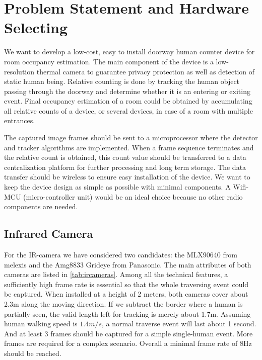\chapter{Problem Statement and Hardware Selecting} \label{ch:hardware}
We want to develop a low-cost, easy to install doorway human counter device for room occupancy estimation. The main component of the device is a low-resolution thermal camera to guarantee privacy protection as well as detection of static human being. Relative counting is done by tracking the human object passing through the doorway and determine whether it is an entering or exiting event. Final occupancy estimation of a room could be obtained by accumulating all relative counts of a device, or several devices, in case of a room with multiple entrances.

The captured image frames should be sent to a microprocessor where the detector and tracker algorithms are implemented. When a frame sequence terminates and the relative count is obtained, this count value should be transferred to a data centralization platform for further processing and long term storage. The data transfer should be wireless to ensure easy installation of the device. We want to keep the device design as simple as possible with minimal components. A Wifi-MCU (micro-controller unit) would be an ideal choice because no other radio components are needed.
\section{Infrared Camera}
For the IR-camera we have considered two candidates: the MLX90640 from melexis and the Amg8833 Grideye from Panasonic. The main attributes of both cameras are listed in \autoref{tab:ircameras}. Among all the technical features, a sufficiently high frame rate is essential so that the whole traversing event could be captured. When installed at a height of 2 meters, both cameras cover about 2.3m along the moving direction. If we subtract the border where a human is partially seen, the valid length left for tracking is merely about 1.7m. Assuming human walking speed is $1.4m/s$, a normal traverse event will last about 1 second. And at least 3 frames should be captured for a simple single-human event. More frames are required for a complex scenario. Overall a minimal frame rate of 8Hz should be reached.

